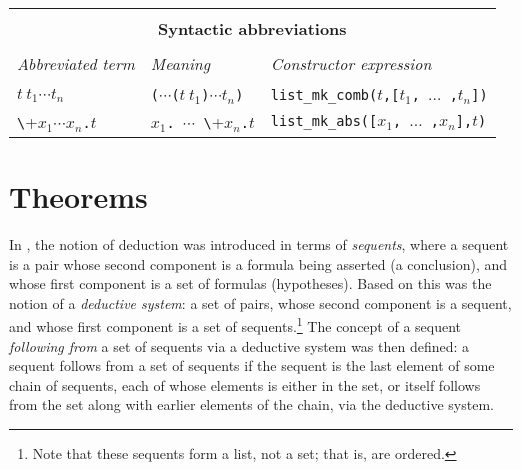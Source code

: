\begin{center}

\begin{tabular}{|l|l|l|} \hline
\multicolumn{3}{|c|}{ } \\
\multicolumn{3}{|c|}{\bf Syntactic abbreviations} \\
\multicolumn{3}{|c|}{ } \\
{\it Abbreviated term} & {\it Meaning} &
{\it Constructor expression} \\ \hline
 & &  \\
$t\ t_1 \cdots t_n$ &
{\small\verb+(+}$\cdots${\small\verb+(+}$t\ t_1${\small\verb+)+}$\cdots t_n${\small\verb+)+} &
{\small\verb+list_mk_comb(+}$t${\small\verb+,[+}$t_1${\small\verb+, +}$\ldots${\small\verb+ ,+}$t_n${\small\verb+])+} \\ \hline
{\small\verb+\+}$x_1\cdots x_n${\small\verb+.+}$t$ &
\holtxt{\bs}$x_1${\small\verb+. +}$\cdots${\small\verb+ \+}$x_n${\small\verb+.+}$t$ &
{\small\verb+list_mk_abs([+}$x_1${\small\verb+, +}$\ldots${\small\verb+ ,+}$x_n${\small\verb+],+}$t${\small\verb+)+}
\\ \hline
\end{tabular}
\end{center}


\section{Theorems}
\label{sec:theorems-in-ml}

In \LOGIC, the notion of deduction was introduced in terms of
\textit{sequents},
%
%
where a sequent is a pair whose second component is a formula being
asserted (a conclusion),
%
%
and whose first component is a set of formulas
(hypotheses).
%
%
Based on this was the notion of a \textit{deductive
  system}:
%
a set of pairs, whose second component is a sequent, and whose first
component is a set of sequents.\footnote{Note that these sequents form
  a list, not a set; that is, are ordered.}  The concept of a sequent
\textit{following from}
%
%
a set of sequents via a deductive system was then defined: a sequent
follows from a set of sequents if the sequent is the last element of
some chain of sequents, each of whose elements is either in the set,
or itself follows from the set along with earlier elements of the
chain, via the deductive system.

